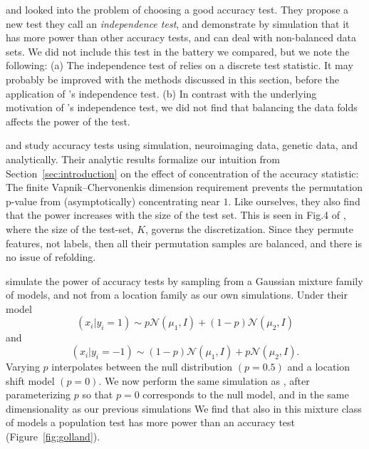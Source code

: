 \documentclass[12pt,a4paper]{article}
\theoremstyle{definition}
\newcommand{\gauss}[1]{\mathcal{N}\left(#1\right)} %
\begin{document}
\cite{olivetti_induction_2012} and \cite{olivetti_statistical_2014} looked into the problem of choosing a good accuracy test. 
They propose a new test they call an \emph{independence test}, and demonstrate by simulation that it has more power than other accuracy tests, and can deal with non-balanced data sets. 
We did not include this test in the battery we compared, but we note the following: 
(a) The independence test of \cite{olivetti_induction_2012} relies on a discrete test statistic. 
It may probably be improved with the methods discussed in this section, before the application of \cite{olivetti_induction_2012}'s independence test. 
(b) In contrast with the underlying motivation of \cite{olivetti_induction_2012}'s independence test, we did not find that balancing the data folds affects the power of the test. 


\cite{golland_permutation_2003} and \cite{golland_permutation_2005} study accuracy tests using simulation, neuroimaging data, genetic data, and analytically.
Their analytic results formalize our intuition from Section~\ref{sec:introduction} on the effect of concentration of the accuracy statistic:
The finite Vapnik–Chervonenkis dimension requirement \citep[Sec 4.3]{golland_permutation_2005} prevents the permutation p-value from (asymptotically) concentrating near $1$. 
Like ourselves, they also find that the power increases with the size of the test set. 
This is seen in Fig.4 of \citet{golland_permutation_2005}, where the size of the test-set, $K$, governs the discretization. 
Since they permute features, not labels, then all their permutation samples are balanced, and there is no issue of refolding. 

\cite{golland_permutation_2005} simulate the power of accuracy tests by sampling from a Gaussian mixture family of models, and not from a location family as our own simulations. 
Under their model 
$$(x_i|y_i=1) \sim p \gauss{\mu_1,I}+ (1-p) \gauss{\mu_2,I}$$ 
and 
$$(x_i|y_i=-1) \sim (1-p) \gauss{\mu_1,I}+ p \gauss{\mu_2,I}.$$
Varying $p$ interpolates between the null distribution $(p=0.5)$ and a location shift model $(p=0)$. 
We now perform the same simulation as \cite{golland_permutation_2005}, after parameterizing $p$ so that $p=0$ corresponds to the null model, and in the same dimensionality as our previous simulations
We find that also in this mixture class of models a population test has more power than an accuracy test (Figure~\ref{fig:golland}).
\end{document}
